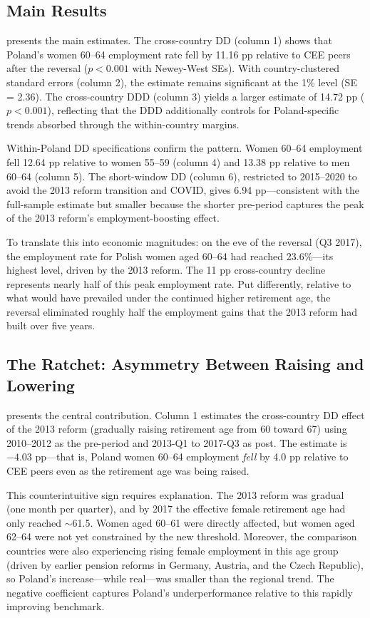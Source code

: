 \documentclass[12pt]{article}
\begin{document}
\subsection{Main Results}

 presents the main estimates. The cross-country DD (column 1) shows that Poland's women 60--64 employment rate fell by 11.16 pp relative to CEE peers after the reversal ($p < 0.001$ with Newey-West SEs). With country-clustered standard errors (column 2), the estimate remains significant at the 1\% level (SE = 2.36). The cross-country DDD (column 3) yields a larger estimate of 14.72 pp ($p < 0.001$), reflecting that the DDD additionally controls for Poland-specific trends absorbed through the within-country margins.

Within-Poland DD specifications confirm the pattern. Women 60--64 employment fell 12.64 pp relative to women 55--59 (column 4) and 13.38 pp relative to men 60--64 (column 5). The short-window DD (column 6), restricted to 2015--2020 to avoid the 2013 reform transition and COVID, gives 6.94 pp---consistent with the full-sample estimate but smaller because the shorter pre-period captures the peak of the 2013 reform's employment-boosting effect.



To translate this into economic magnitudes: on the eve of the reversal (Q3 2017), the employment rate for Polish women aged 60--64 had reached 23.6\%---its highest level, driven by the 2013 reform. The 11 pp cross-country decline represents nearly half of this peak employment rate. Put differently, relative to what would have prevailed under the continued higher retirement age, the reversal eliminated roughly half the employment gains that the 2013 reform had built over five years.

\subsection{The Ratchet: Asymmetry Between Raising and Lowering}

 presents the central contribution. Column 1 estimates the cross-country DD effect of the 2013 reform (gradually raising retirement age from 60 toward 67) using 2010--2012 as the pre-period and 2013-Q1 to 2017-Q3 as post. The estimate is $-4.03$ pp---that is, Poland women 60--64 employment \textit{fell} by 4.0 pp relative to CEE peers even as the retirement age was being raised.

This counterintuitive sign requires explanation. The 2013 reform was gradual (one month per quarter), and by 2017 the effective female retirement age had only reached $\sim$61.5. Women aged 60--61 were directly affected, but women aged 62--64 were not yet constrained by the new threshold. Moreover, the comparison countries were also experiencing rising female employment in this age group (driven by earlier pension reforms in Germany, Austria, and the Czech Republic), so Poland's increase---while real---was smaller than the regional trend. The negative coefficient captures Poland's underperformance relative to this rapidly improving benchmark.
\end{document}
